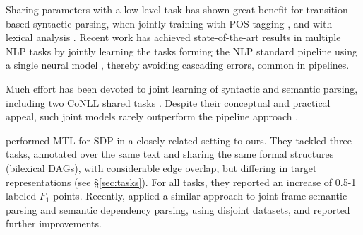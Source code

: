 \documentclass[11pt,a4paper]{article}
\begin{document}
Sharing parameters with a low-level task
has shown great benefit for transition-based syntactic parsing,
when jointly training with POS tagging
\cite{bohnet2012transition,Zhang2016StackpropagationIR}, and
with lexical analysis \cite{constant-nivre:2016:P16-1,more2016joint}.
Recent work has achieved state-of-the-art results in multiple NLP tasks
by jointly learning the tasks forming the NLP standard pipeline using 
a single neural model \cite{collobert2011natural,D17-1206},
thereby avoiding cascading errors, common in pipelines.

Much effort has been devoted to joint learning of syntactic
and semantic parsing, including
two CoNLL shared tasks \cite{surdeanu2008conll,hajivc2009conll}.
Despite their conceptual and practical appeal, such joint models rarely outperform
the pipeline approach %
\cite{lluis2008joint,henderson2013multilingual,D15-1169,swayamdipta-EtAl:2016:CoNLL,swayamdipta2017frame}.

\citet{P17-1186} performed MTL for SDP in a closely related setting to ours.
They tackled three tasks, annotated over the same text
and sharing the same formal structures (bilexical DAGs),
with considerable edge overlap,
but differing in target representations (see \S\ref{sec:tasks}).
For all tasks, they reported an increase of 0.5-1 labeled $F_1$ points.
Recently, \citet{Peng-EtAl:2018:NAACL} applied a similar approach to
joint frame-semantic parsing and semantic dependency parsing,
using disjoint datasets, and reported further improvements.


\end{document}
